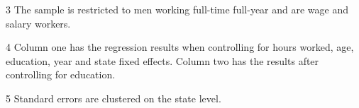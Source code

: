 \begin{table}[H]
\begin{threeparttable}
\begin{tablenotes}
\item[3] {\footnotesize{The sample is restricted to men working full-time full-year and are wage and salary workers.}}
\item[4] {\footnotesize{Column one has the regression results when controlling for hours worked, age, education, year and state fixed effects. Column two has the results after controlling for education.}}
\item[5] {\footnotesize{Standard errors are clustered on the state level.}}
\end{tablenotes}
\end{threeparttable}
\end{table}
